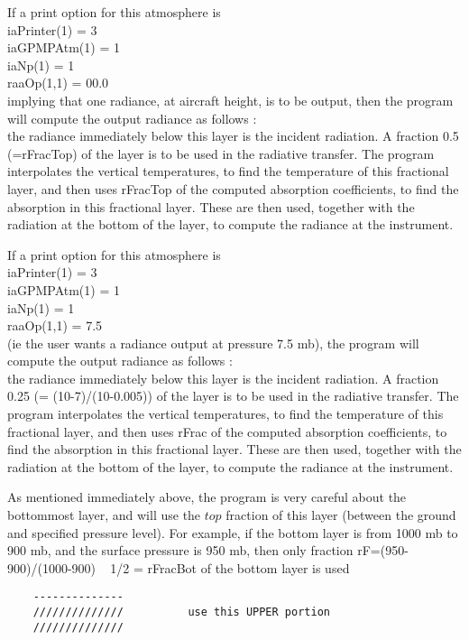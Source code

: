 \documentclass[12pt]{article}
\newcommand{\ttab}{\indent\indent}
\begin{document}
{{If a print option for this atmosphere is\\
\medskip
\ttab iaPrinter(1) = 3\\
\ttab iaGPMPAtm(1) = 1\\
\ttab iaNp(1)      = 1\\
\ttab raaOp(1,1)   = 00.0\\
implying that one radiance, at aircraft height, is to be output, then
the program will compute the output radiance as follows : \\
the radiance immediately below this layer is the incident radiation. A 
fraction 0.5 (=rFracTop) of the layer is to be used in the radiative transfer.
The program interpolates the vertical temperatures, to find the temperature
of this fractional layer, and then uses rFracTop of the computed absorption
coefficients, to find the absorption in this fractional layer. These
are then used, together with the radiation at the bottom of the layer, to
compute the radiance at the instrument.

If a print option for this atmosphere is\\
\medskip
\ttab iaPrinter(1) = 3\\
\ttab iaGPMPAtm(1) = 1\\
\ttab iaNp(1)      = 1\\
\ttab raaOp(1,1)   = 7.5\\
(ie the user wants a radiance output at pressure 7.5 mb), the program will 
compute the output radiance as follows : \\
the radiance immediately below this layer is the incident radiation. A 
fraction 0.25 (= (10-7)/(10-0.005)) of the layer is to be used in the 
radiative transfer.
The program interpolates the vertical temperatures, to find the temperature
of this fractional layer, and then uses rFrac of the computed absorption
coefficients, to find the absorption in this fractional layer. These
are then used, together with the radiation at the bottom of the layer, to
compute the radiance at the instrument. 

As mentioned immediately above, the program is very careful about the 
bottommost layer, and will use the $top$ fraction of this layer (between
the ground and specified pressure level). For example, if the bottom layer is 
from 1000 mb to 900 mb, and the surface pressure  is 950 mb, then only 
fraction rF=(950-900)/(1000-900) ~ 1/2 =  rFracBot of the bottom layer is used
\begin{verbatim}
    --------------
    //////////////          use this UPPER portion
    //////////////


\end{verbatim}}}
\end{document}
